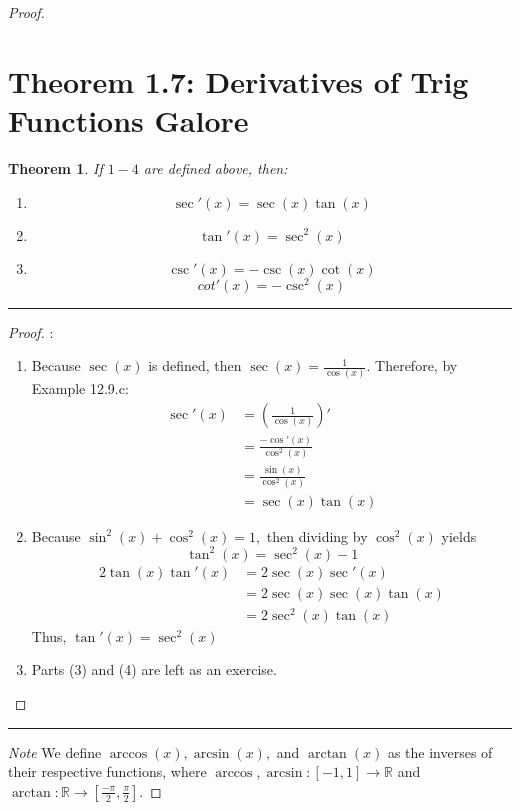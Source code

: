 \documentclass[openany, amssymb, psamsfonts]{amsart}
\newcommand{\bbR}{\mathbb{R}}
\newtheorem{thm}{Theorem}[section]
\theoremstyle{definition}
\numberwithin{equation}{section}
\begin{document}
\begin{proof}
\section*{Theorem 1.7: Derivatives of Trig Functions Galore}
\begin{thm}
If $1-4$ are defined above, then:
\begin{enumerate}
\item \[\sec'(x) = \sec(x)\tan(x)\]
\item \[\tan'(x) = \sec^2(x)\]
\item \[\csc'(x) = -\csc(x)\cot(x)\]
\[cot'(x) = -\csc^2(x)\]
\end{enumerate}
\end{thm}
\vspace{4pt}     \hrule   \vspace{4pt}\begin{proof}:\\
\begin{enumerate}
\item Because $\sec(x)$ is defined, then $\sec(x) = \frac{1}{\cos(x)}.$ Therefore, by Example 12.9.c:
\begin{align*}
\sec'(x) &= (\frac{1}{\cos(x)})'\\
&= \frac{-\cos'(x)}{\cos^2(x)}\\
&= \frac{\sin(x)}{\cos^2(x)}\\
&= \sec(x)\tan(x)
\end{align*}
\item Because $\sin^2(x) + \cos^2(x) = 1,$ then dividing by $\cos^2(x)$ yields \[\tan^2(x) = \sec^2(x) -1\]
\begin{align*}
2\tan(x)\tan'(x) &= 2\sec(x)\sec'(x)\\
&= 2\sec(x)\sec(x)\tan(x)\\
&= 2\sec^2(x)\tan(x)
\end{align*}
Thus, $\tan'(x) = \sec^2(x)$
\item Parts (3) and (4) are left as an exercise.
\end{enumerate}
\end{proof}\vspace{4pt}     \hrule   \vspace{4pt}

\textit{Note}
We define $\arccos(x), \arcsin(x),$ and $\arctan(x)$ as the inverses of their respective functions, where $\arccos, \arcsin:[-1,1]\to \mathbb{R}$ and $\arctan:\bbR\to [\frac{-\pi}{2}, \frac{\pi}{2}].$


\end{proof}
\end{document}
